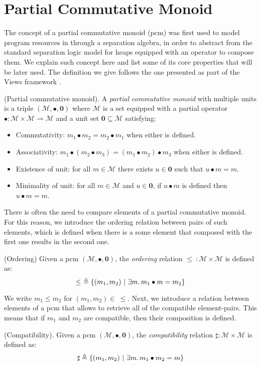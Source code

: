 \section{Partial Commutative Monoid}

\label{sec:pcm}

The concept of a partial commutative monoid (pcm) was first used to model program resources in \cite{sepalgebra} through a separation algebra, in order to abstract from the standard separation logic model for heaps equipped with an operator to compose them. We explain such concept here and list some of its core properties that will be later used. The definition we give follows the one presented as part of the Views framework \cite{views}.

\begin{defn}
	(Partial commutative monoid).
	A \emph{partial commutative monoid} with multiple units is a triple $(\mathcal{M}, \bullet, \mathbf{0})$ where $\mathcal{M}$ is a set equipped with a partial operator $\bullet : \mathcal{M} \times \mathcal{M} \rightharpoonup \mathcal{M}$ and a unit set $\mathbf{0} \subseteq \mathcal{M}$ satisfying:
	\begin{itemize}
		\item Commutativity: $m_1 \bullet m_2 = m_2 \bullet m_1$ when either is defined.
		\item Associativity: $m_1 \bullet (m_2 \bullet m_3) = (m_1 \bullet m_2) \bullet m_3$ when either is defined.
		\item Existence of unit: for all $m \in \mathcal{M}$ there exists $u \in \mathbf{0}$ such that $u \bullet m = m$.
		\item Minimality of unit: for all $m \in \mathcal{M}$ and $u \in \mathbf{0}$, if $u \bullet m$ is defined then $u \bullet m = m$.
	\end{itemize}
\end{defn}

There is often the need to compare elements of a partial commutative monoid. For this reason, we introduce the ordering relation between pairs of such elements, which is defined when there is a some element that composed with the first one results in the second one.
\begin{defn}
	(Ordering)
	Given a pcm $(\mathcal{M}, \bullet, \mathbf{0})$, the \emph{ordering} relation $\leq\ : \mathcal{M} \times \mathcal{M}$ is defined as:
\[
	\leq\ \triangleq \{ (m_1, m_2)\ |\ \exists m \ldotp m_1 \bullet m = m_2 \}
\]
\end{defn}
We write $m_1 \leq m_2$ for $(m_1, m_2) \in\ \leq$. Next, we introduce a relation between elements of a pcm that allows to retrieve all of the compatible element-pairs. This means that if $m_1$ and $m_2$ are compatible, then their composition is defined.

\begin{defn}
	(Compatibility).
	Given a pcm $(\mathcal{M}, \bullet, \mathbf{0})$, the \emph{compatibility} relation $\sharp : \mathcal{M} \times \mathcal{M}$ is defined as:
\[
	\sharp \triangleq \{ (m_1, m_2)\ |\ \exists m \ldotp m_1 \bullet m_2 = m \}
\]
\end{defn}